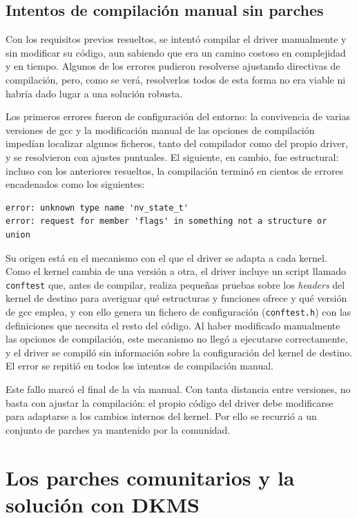 \subsection{Intentos de compilación manual sin parches} \label{sec:cap3-manual}

Con los requisitos previos resueltos, se intentó compilar el driver manualmente y sin modificar su código, aun
sabiendo que era un camino costoso en complejidad y en tiempo. Algunos de los errores pudieron resolverse
ajustando directivas de compilación, pero, como se verá, resolverlos todos de esta forma no era viable
ni habría dado lugar a una solución robusta.

Los primeros errores fueron de configuración del entorno: la convivencia de varias versiones de gcc y la modificación manual de las opciones de compilación impedían localizar algunos ficheros, tanto del compilador como del propio driver, y se resolvieron con ajustes puntuales. El siguiente, en cambio, fue estructural: incluso con los anteriores resueltos, la compilación terminó en cientos de errores encadenados como los siguientes:
\begin{lstlisting}[style=bash]
error: unknown type name 'nv_state_t'
error: request for member 'flags' in something not a structure or union
\end{lstlisting}

Su origen está en el mecanismo con el que el driver se adapta a cada kernel. Como el kernel cambia de una versión a otra, el driver incluye un script llamado \texttt{conftest} que, antes de compilar, realiza pequeñas pruebas sobre los \textit{headers} del kernel de destino para averiguar qué estructuras y funciones ofrece y qué versión de gcc emplea, y con ello genera un fichero de configuración (\texttt{conftest.h}) con las definiciones que necesita el resto del código. Al haber modificado manualmente las opciones de compilación, este mecanismo no llegó a ejecutarse correctamente, y el driver se compiló sin información sobre la configuración del kernel de destino. El error se repitió en todos los intentos de compilación manual.

Este fallo marcó el final de la vía manual. Con tanta distancia entre versiones, no basta con ajustar la compilación: el propio código del driver debe modificarse para adaptarse a los cambios internos del kernel. Por ello se recurrió a un conjunto de parches ya mantenido por la comunidad.

\section{Los parches comunitarios y la solución con DKMS}

